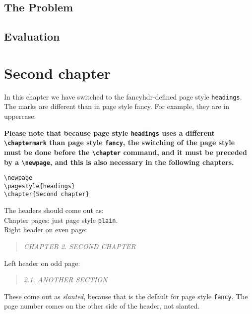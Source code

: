 \documentclass[openany]{book}
\renewcommand{\chaptermark}[1]{\markboth{\thechapter.\ #1}{}}
\renewcommand{\chaptermark}[1]{\markboth{\thechapter.\ ##1}{}}
\renewcommand{\chaptermark}[1]{\markboth{\thechapter.\ ##1}{}}
\begin{document}
\lipsum[1]
\newpage
\section{The Problem}
\label{sec:problem}

\lipsum[2-3]

\section{Evaluation}

\lipsum[3-5]

\lipsum[6]

\newpage
\pagestyle{headings}
\chapter{Second chapter}

\noindent
\begin{boxedminipage}{\textwidth}
In this chapter we have switched to the fancyhdr-defined page style \texttt{headings}. The marks are different than in page style fancy. For example, they are in uppercase.

{\bfseries Please note that because page style \texttt{headings} uses a different \verb|\chaptermark| than page style \texttt{fancy}, the switching of the page style must be done before the \verb|\chapter| command, and it must be preceded by a \verb|\newpage|, and this is also necessary in the following chapters.}
\begin{verbatim}
\newpage
\pagestyle{headings}
\chapter{Second chapter}
\end{verbatim}

The headers should come out as:
\\
Chapter pages: just page style \texttt{plain}.
\\
Right header on even page:
\begin{quote}
  \textsl{CHAPTER 2. SECOND CHAPTER}
\end{quote}
Left header on odd page:
\begin{quote}
  \textsl{2.1. ANOTHER SECTION}
\end{quote}
These come out as \textsl{slanted}, because that is the default for page style \texttt{fancy}.
The page number comes on the other side of the header, not slanted.
\end{boxedminipage}
\bigskip
\end{document}
